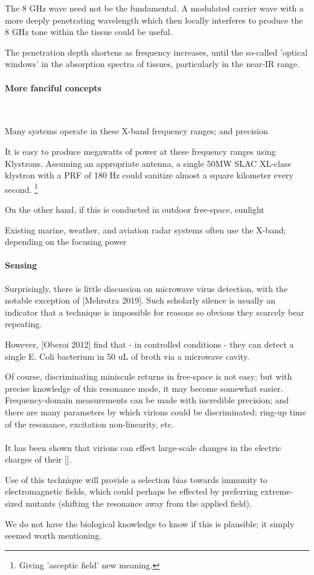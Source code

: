 \documentclass[fleqn,10pt]{article}
\begin{document}
\begin{multicols}{1}
The 8 GHz wave need not be the fundamental. A modulated carrier wave with a more deeply penetrating wavelength which then locally interferes to produce the 8 GHz tone within the tissue could be useful.

The penetration depth shortens as frequency increases, until the so-called 'optical windows' in the absorption spectra of tissues, particularly in the near-IR range. 

\paragraph{\textbf{More fanciful concepts}}\

Many systems operate in these X-band frequency ranges; and precision 

It is easy to produce megawatts of power at these frequency ranges using Klystrons. Assuming an appropriate antenna, a single 50MW SLAC XL-class klystron with a PRF of 180 Hz could sanitize almost a square kilometer every second. \footnote{Giving 'asceptic field' new meaning.}

On the other hand, if this is conducted in outdoor free-space, sunlight

Existing marine, weather, and aviation radar systems often use the X-band; depending on the focusing power

\paragraph{Sensing}

Surprisingly, there is little discussion on microwave virus detection, with the notable exception of [Mehrotra 2019]. Such scholarly silence is usually an indicator that a technique is impossible for reasons so obvious they scarcely bear repeating. 

However, [Oberoi 2012] find that - in controlled conditions - they can detect a single E. Coli bacterium in 50 uL of broth via a microwave cavity. 

Of course, discriminating miniscule returns in free-space is not easy; but with precise knowledge of this resonance mode, it may become somewhat easier. Frequency-domain measurements can be made with incredible precision; and there are many parameters by which virions could be discriminated; ring-up time of the resonance, excitation non-linearity, etc.

\paragraph{}

It has been shown that virions can effect large-scale changes in the electric charges of their []. 

Use of this technique will provide a selection bias towards immunity to electromagnetic fields, which could perhaps be effected by preferring extreme-sized mutants (shifting the resonance away from the applied field). 

We do not have the biological knowledge to know if this is plausible; it simply seemed worth mentioning. 

\end{multicols}
\end{document}
